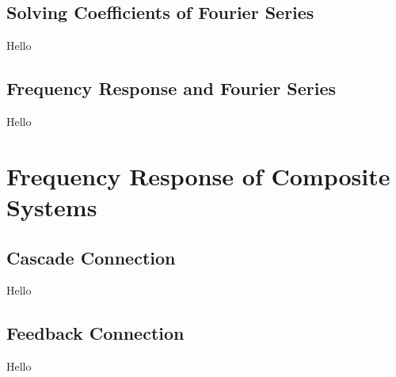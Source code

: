 \subsection{Solving Coefficients of Fourier Series}
Hello

\subsection{Frequency Response and Fourier Series}
Hello

\section{Frequency Response of Composite Systems}
\subsection{Cascade Connection}
Hello

\subsection{Feedback Connection}
Hello
